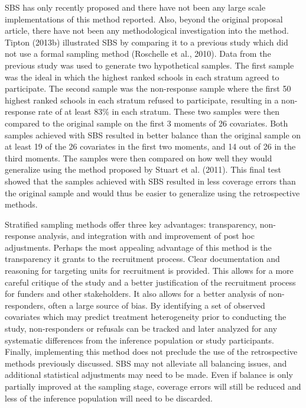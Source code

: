 \documentclass[man,floatsintext]{apa6}
\theoremstyle{definition}
\theoremstyle{definition}
\theoremstyle{definition}
\theoremstyle{remark}
\begin{document}
SBS has only recently proposed and there have not been any large scale
implementations of this method reported. Also, beyond the original
proposal article, there have not been any methodological investigation
into the method. Tipton (2013b) illustrated SBS by comparing it to a
previous study which did not use a formal sampling method (Roschelle et
al., 2010). Data from the previous study was used to generate two
hypothetical samples. The first sample was the ideal in which the
highest ranked schools in each stratum agreed to participate. The second
sample was the non-response sample where the first 50 highest ranked
schools in each stratum refused to participate, resulting in a
non-response rate of at least 83\% in each stratum. These two samples
were then compared to the original sample on the first 3 moments of 26
covariates. Both samples achieved with SBS resulted in better balance
than the original sample on at least 19 of the 26 covariates in the
first two moments, and 14 out of 26 in the third moments. The samples
were then compared on how well they would generalize using the method
proposed by Stuart et al. (2011). This final test showed that the
samples achieved with SBS resulted in less coverage errors than the
original sample and would thus be easier to generalize using the
retrospective methods.

Stratified sampling methods offer three key advantages: transparency,
non-response analysis, and integration with and improvement of post hoc
adjustments. Perhaps the most appealing advantage of this method is the
transparency it grants to the recruitment process. Clear documentation
and reasoning for targeting units for recruitment is provided. This
allows for a more careful critique of the study and a better
justification of the recruitment process for funders and other
stakeholders. It also allows for a better analysis of non-responders,
often a large source of bias. By identifying a set of observed
covariates which may predict treatment heterogeneity prior to conducting
the study, non-responders or refusals can be tracked and later analyzed
for any systematic differences from the inference population or study
participants. Finally, implementing this method does not preclude the
use of the retrospective methods previously discussed. SBS may not
alleviate all balancing issues, and additional statistical adjustments
may need to be made. Even if balance is only partially improved at the
sampling stage, coverage errors will still be reduced and less of the
inference population will need to be discarded.
\end{document}
